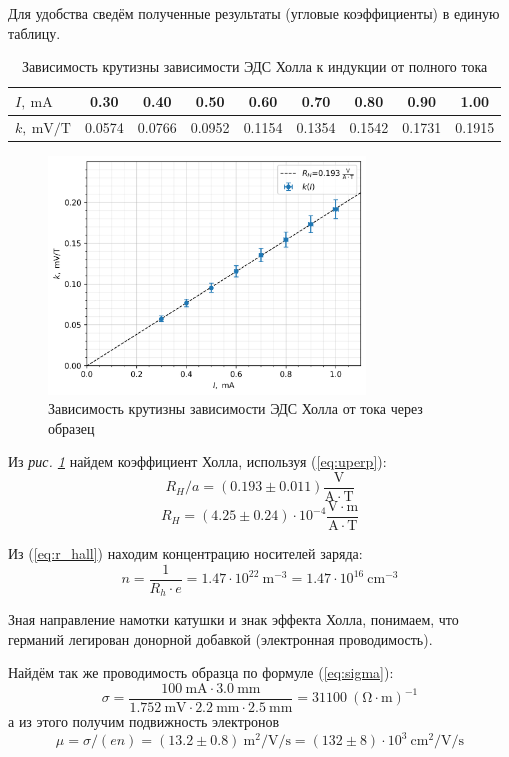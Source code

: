 \documentclass[12pt, a4paper]{article}
\newcommand{\mV}{~\mathrm{mV}}
\newcommand{\mA}{~\mathrm{mA}}
\begin{document}
Для удобства сведём полученные результаты (угловые коэффициенты) в единую таблицу.
\begin{table}[H]
  \begin{tabular}{|l|c|c|c|c|c|c|c|c|}

    \hline
    $I,~\mathrm{mA}$ & 0.30 & 0.40 & 0.50 & 0.60 & 0.70 & 0.80 & 0.90 & 1.00 \\ \hline
    $k,~\mathrm{mV/T}$ & 0.0574 & 0.0766 & 0.0952 & 0.1154 & 0.1354 & 0.1542 & 0.1731 & 0.1915 \\
    \hline
  \end{tabular}
  \caption{Зависимость крутизны зависимости ЭДС Холла к индукции от полного тока}
\end{table}

\begin{figure}[H]
  \includegraphics[width=0.75\textwidth]{pics/hallconst.png}
  \caption{Зависимость крутизны зависимости ЭДС Холла от тока через образец}
  \label{fig:hallconst}
\end{figure}

Из \textit{рис. \ref{fig:hallconst}} найдем коэффициент Холла, используя (\ref{eq:uperp}):
\[R_H / a= (0.193\pm 0.011) \mathrm{\dfrac{V}{A\cdot T}}\]
\[R_H = (4.25\pm 0.24)\cdot 10^{-4} \mathrm{\dfrac{V\cdot m}{A\cdot T}}\]

Из (\ref{eq:r_hall}) находим концентрацию носителей заряда:
\[n = \dfrac{1}{R_h \cdot e} = 1.47\cdot 10^{22}~\mathrm{m^{-3}} = 1.47\cdot 10^{16}~\mathrm{cm^{-3}}\]

Зная направление намотки катушки и знак эффекта Холла, понимаем, что германий легирован донорной добавкой (электронная проводимость).

Найдём так же проводимость образца по формуле (\ref{eq:sigma}):
\[\sigma = \frac{100\mA \cdot 3.0~\mathrm{mm}}{1.752\mV\cdot 2.2~\mathrm{mm} \cdot 2.5~\mathrm{mm}} = 31100 ~(\mathrm{\Omega\cdot m})^{-1}\]
а из этого получим подвижность электронов
\[\mu = \sigma/(en) = (13.2\pm 0.8)~\mathrm{m^2/V/s} = (132\pm 8)\cdot10^3~\mathrm{cm^2/V/s}\]
\end{document}
